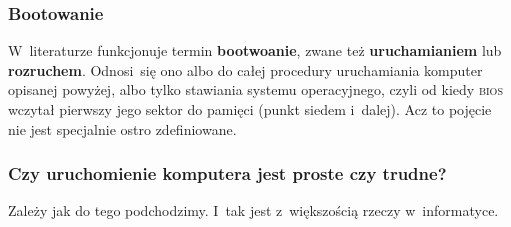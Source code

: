 \documentclass[10pt,t]{beamer}
\begin{document}
\begin{frame}
  \frametitle{Bootowanie}


  W~literaturze funkcjonuje termin \textbf{bootwoanie}, zwane też
  \textbf{uruchamianiem} lub \textbf{rozruchem}. Odnosi~się ono albo do
  całej procedury uruchamiania komputer opisanej powyżej, albo tylko
  stawiania systemu operacyjnego, czyli od kiedy \textsc{bios} wczytał
  pierwszy jego sektor do pamięci (punkt siedem i~dalej). Acz to pojęcie
  nie jest specjalnie ostro zdefiniowane.

\end{frame}





\begin{frame}
  \frametitle{Czy uruchomienie komputera jest proste czy trudne?}


  Zależy jak do tego podchodzimy. I~tak jest z~większością rzeczy
  w~informatyce.

\end{frame}


















\end{document}
